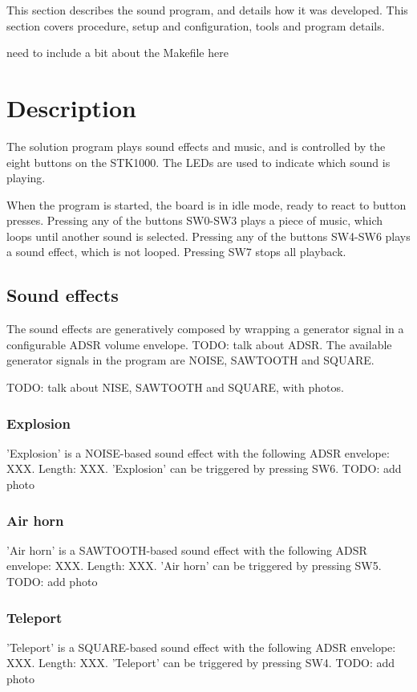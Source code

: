 
This section describes the sound program, and details how it was developed. This section covers procedure, setup and configuration, tools and program details.

need to include a bit about the Makefile here


\section{Description}

The solution program plays sound effects and music, and is controlled by the eight buttons on the STK1000.
The LEDs are used to indicate which sound is playing.

When the program is started, the board is in idle mode, ready to react to button presses.
Pressing any of the buttons SW0-SW3 plays a piece of music, which loops until another sound is selected.
Pressing any of the buttons SW4-SW6 plays a sound effect, which is not looped.
Pressing SW7 stops all playback.

\subsection{Sound effects}

The sound effects are generatively composed by wrapping a generator signal in a configurable ADSR volume envelope.
TODO: talk about ADSR.
The available generator signals in the program are NOISE, SAWTOOTH and SQUARE.

TODO: talk about NISE, SAWTOOTH and SQUARE, with photos.

\subsubsection{Explosion}

'Explosion' is a NOISE-based sound effect with the following ADSR envelope: XXX.
Length: XXX.
'Explosion' can be triggered by pressing SW6.
TODO: add photo

\subsubsection{Air horn}
'Air horn' is a SAWTOOTH-based sound effect with the following ADSR envelope: XXX.
Length: XXX.
'Air horn' can be triggered by pressing SW5.
TODO: add photo

\subsubsection{Teleport}
'Teleport' is a SQUARE-based sound effect with the following ADSR envelope: XXX.
Length: XXX.
'Teleport' can be triggered by pressing SW4.
TODO: add photo


